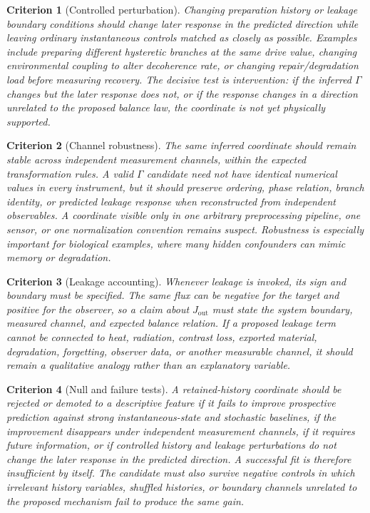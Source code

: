 \documentclass[11pt,a4paper]{article}
\newtheorem{criterion}{Criterion}
\newcommand{\Ghist}{\Gamma}
\newcommand{\Jout}{J_{\mathrm{out}}}
\begin{document}
\begin{criterion}[Controlled perturbation]
Changing preparation history or leakage boundary conditions should change later response in the predicted direction while leaving ordinary instantaneous controls matched as closely as possible.  Examples include preparing different hysteretic branches at the same drive value, changing environmental coupling to alter decoherence rate, or changing repair/degradation load before measuring recovery.  The decisive test is intervention: if the inferred \(\Ghist\) changes but the later response does not, or if the response changes in a direction unrelated to the proposed balance law, the coordinate is not yet physically supported.
\end{criterion}

\begin{criterion}[Channel robustness]
The same inferred coordinate should remain stable across independent measurement channels, within the expected transformation rules.  A valid \(\Ghist\) candidate need not have identical numerical values in every instrument, but it should preserve ordering, phase relation, branch identity, or predicted leakage response when reconstructed from independent observables.  A coordinate visible only in one arbitrary preprocessing pipeline, one sensor, or one normalization convention remains suspect.  Robustness is especially important for biological examples, where many hidden confounders can mimic memory or degradation.
\end{criterion}

\begin{criterion}[Leakage accounting]
Whenever leakage is invoked, its sign and boundary must be specified.  The same flux can be negative for the target and positive for the observer, so a claim about \(\Jout\) must state the system boundary, measured channel, and expected balance relation.  If a proposed leakage term cannot be connected to heat, radiation, contrast loss, exported material, degradation, forgetting, observer data, or another measurable channel, it should remain a qualitative analogy rather than an explanatory variable.
\end{criterion}

\begin{criterion}[Null and failure tests]
A retained-history coordinate should be rejected or demoted to a descriptive feature if it fails to improve prospective prediction against strong instantaneous-state and stochastic baselines, if the improvement disappears under independent measurement channels, if it requires future information, or if controlled history and leakage perturbations do not change the later response in the predicted direction.  A successful fit is therefore insufficient by itself.  The candidate must also survive negative controls in which irrelevant history variables, shuffled histories, or boundary channels unrelated to the proposed mechanism fail to produce the same gain.
\end{criterion}
\end{document}
